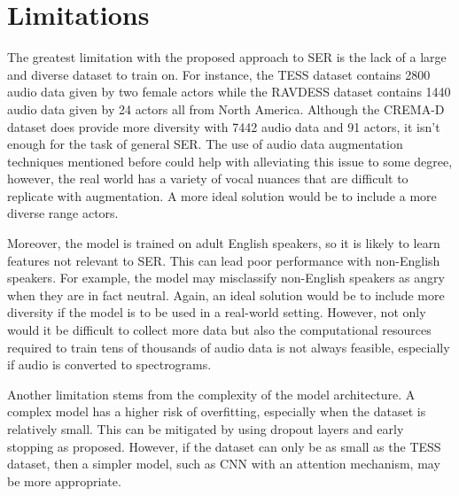 \documentclass[../main.tex]{subfiles}
\begin{document}
\section{Limitations}



The greatest limitation with the proposed approach to SER is the lack of 
a large and diverse dataset to train on. For instance, the TESS dataset contains 2800 
audio data given by two female actors while the RAVDESS dataset contains
1440 audio data given by 24 actors all from North America. Although the
CREMA-D dataset does provide more diversity with 7442 audio data and 91 actors, 
it isn't enough for the task of general SER. The use of audio data augmentation
techniques mentioned before could help with alleviating this issue to 
some degree, however, the real world has a variety of vocal nuances that
are difficult to replicate with augmentation. A more ideal solution would be to 
include a more diverse range actors. 

Moreover, the model is trained on adult English speakers, so it is likely to 
learn features not relevant to SER. This can lead poor performance with 
non-English speakers. For example, the model may misclassify non-English speakers 
as angry when they are in fact neutral. Again, an ideal solution would be to 
include more diversity if the model is to be used in a real-world setting. 
However, not only would it be difficult to collect more data but also the 
computational resources required to train tens of thousands of audio data 
is not always feasible, especially if audio is converted to spectrograms.

Another limitation stems from the complexity of the model architecture. A complex 
model has a higher risk of overfitting, especially when the dataset is 
relatively small. This can be mitigated by using dropout layers and early stopping
as proposed. However, if the dataset can only be as small as the TESS dataset, then 
a simpler model, such as CNN with an attention mechanism, may be more appropriate.
\end{document}
